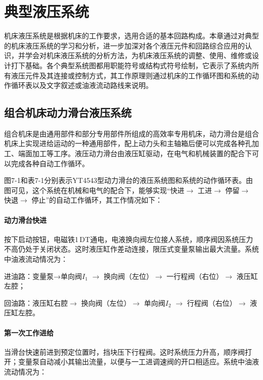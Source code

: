 \chapter{典型液压系统}

机床液压系统是根据机床的工作要求，选用合适的基本回路构成。本章通过对典型的机床液压系统的学习和分析，进一步加深对各个液压元件和回路综合应用的认识，并学会对机床液压系统的分析方法，为机床液压系统的调整、使用、维修或设计打下基础。各个典型系统图都用职能符号或结构式符号绘制，它表示了系统内所有液压元件及其连接或控制方式，其工作原理则通过机床的工作循环图和系统的动作循环表以及文字叙述或油液流动路线来说明。

\section{组合机床动力滑台液压系统}

组合机床是由通用部件和部分专用部件所组成的高效率专用机床，动力滑台是组合机床上实现进给运动的一种通用部件，配上动力头和主轴箱后便可以完成各种孔加工、端面加工等工序。液压动力滑台由液压缸驱动，在电气和机械装置的配合下可以完成各种自动工作循环。

图7-1和表7-1分别表示YT4543型动力滑台的液压系统图和系统的动作循环表。由图可见，这个系统在机械和电气的配合下，能够实现“快进$\rightarrow$ 工进$\rightarrow$ 停留$\rightarrow$ 快退$\rightarrow$ 停止”的自动工作循环，其工作情况如下：

\subsubsection {动力滑台快进}
按下启动按钮，电磁铁1\,DT通电，电液换向阀左位接人系统，顺序阀因系统压力不高仍处于关闭状态。这时液压缸作差动连接，限压式变量泵输出最大流量。系统中油液流动情况为： 

进油路：变量泵→单向阀$I_{1}$ $\rightarrow$ 换向阀（左位）$\rightarrow$ 一行程阀（右位）$\rightarrow$ 液压缸左腔；

回油路：液压缸右腔$\rightarrow$ 换向阀（左位）$\rightarrow$ 单向阀$I_{2}$ $\rightarrow$ 行程阀（右位）$\rightarrow$ 液压缸左腔。

\subsubsection {第一次工作进给}

当滑台快速前进到预定位置时，挡块压下行程阀。这时系统压力升高，顺序阀打开；变量泵自动减小其输出流量，以便与一工进调速阀的开口相适应。系统中油液流动情况为：

